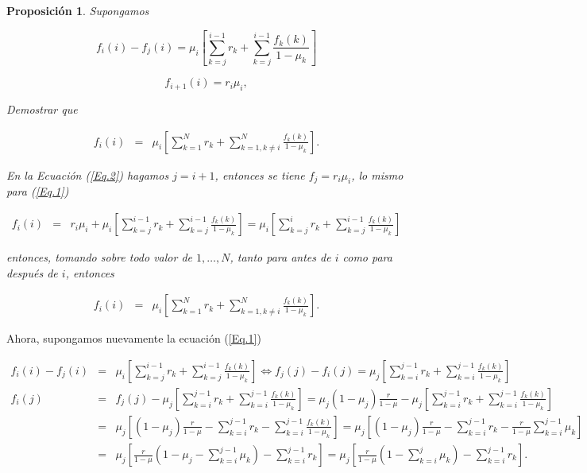 \documentclass{article}
\newtheorem{Prop}{Proposición}[section]
\numberwithin{equation}{section}
\begin{document}
\begin{Prop}
Supongamos

\begin{equation}\label{Eq.1}
f_{i}\left(i\right)-f_{j}\left(i\right)=\mu_{i}\left[\sum_{k=j}^{i-1}r_{k}+\sum_{k=j}^{i-1}\frac{f_{k}\left(k\right)}{1-\mu_{k}}\right]
\end{equation}

\begin{equation}\label{Eq.2}
f_{i+1}\left(i\right)=r_{i}\mu_{i},
\end{equation}

Demostrar que

\begin{eqnarray*}
f_{i}\left(i\right)&=&\mu_{i}\left[\sum_{k=1}^{N}r_{k}+\sum_{k=1,k\neq i}^{N}\frac{f_{k}\left(k\right)}{1-\mu_{k}}\right].
\end{eqnarray*}

En la Ecuaci\'on (\ref{Eq.2}) hagamos $j=i+1$, entonces se tiene $f_{j}=r_{i}\mu_{i}$, lo mismo para (\ref{Eq.1})

\begin{eqnarray*}
f_{i}\left(i\right)&=&r_{i}\mu_{i}+\mu_{i}\left[\sum_{k=j}^{i-1}r_{k}+\sum_{k=j}^{i-1}\frac{f_{k}\left(k\right)}{1-\mu_{k}}\right]=\mu_{i}\left[\sum_{k=j}^{i}r_{k}+\sum_{k=j}^{i-1}\frac{f_{k}\left(k\right)}{1-\mu_{k}}\right]
\end{eqnarray*}

entonces, tomando sobre todo valor de $1,\ldots,N$, tanto para antes de $i$ como para despu\'es de $i$, entonces

\begin{eqnarray*}
f_{i}\left(i\right)&=&\mu_{i}\left[\sum_{k=1}^{N}r_{k}+\sum_{k=1,k\neq i}^{N}\frac{f_{k}\left(k\right)}{1-\mu_{k}}\right].
\end{eqnarray*}
\end{Prop}

Ahora, supongamos nuevamente la ecuaci\'on (\ref{Eq.1})

\begin{eqnarray*}
f_{i}\left(i\right)-f_{j}\left(i\right)&=&\mu_{i}\left[\sum_{k=j}^{i-1}r_{k}+\sum_{k=j}^{i-1}\frac{f_{k}\left(k\right)}{1-\mu_{k}}\right]\Leftrightarrow
f_{j}\left(j\right)-f_{i}\left(j\right)=\mu_{j}\left[\sum_{k=i}^{j-1}r_{k}+\sum_{k=i}^{j-1}\frac{f_{k}\left(k\right)}{1-\mu_{k}}\right]\\
f_{i}\left(j\right)&=&f_{j}\left(j\right)-\mu_{j}\left[\sum_{k=i}^{j-1}r_{k}+\sum_{k=i}^{j-1}\frac{f_{k}\left(k\right)}{1-\mu_{k}}\right]=\mu_{j}\left(1-\mu_{j}\right)\frac{r}{1-\mu}-\mu_{j}\left[\sum_{k=i}^{j-1}r_{k}+\sum_{k=i}^{j-1}\frac{f_{k}\left(k\right)}{1-\mu_{k}}\right]\\
&=&\mu_{j}\left[\left(1-\mu_{j}\right)\frac{r}{1-\mu}-\sum_{k=i}^{j-1}r_{k}-\sum_{k=i}^{j-1}\frac{f_{k}\left(k\right)}{1-\mu_{k}}\right]=\mu_{j}\left[\left(1-\mu_{j}\right)\frac{r}{1-\mu}-\sum_{k=i}^{j-1}r_{k}-\frac{r}{1-\mu}\sum_{k=i}^{j-1}\mu_{k}\right]\\
&=&\mu_{j}\left[\frac{r}{1-\mu}\left(1-\mu_{j}-\sum_{k=i}^{j-1}\mu_{k}\right)-\sum_{k=i}^{j-1}r_{k}\right]=\mu_{j}\left[\frac{r}{1-\mu}\left(1-\sum_{k=i}^{j}\mu_{k}\right)-\sum_{k=i}^{j-1}r_{k}\right].
\end{eqnarray*}
\end{document}
